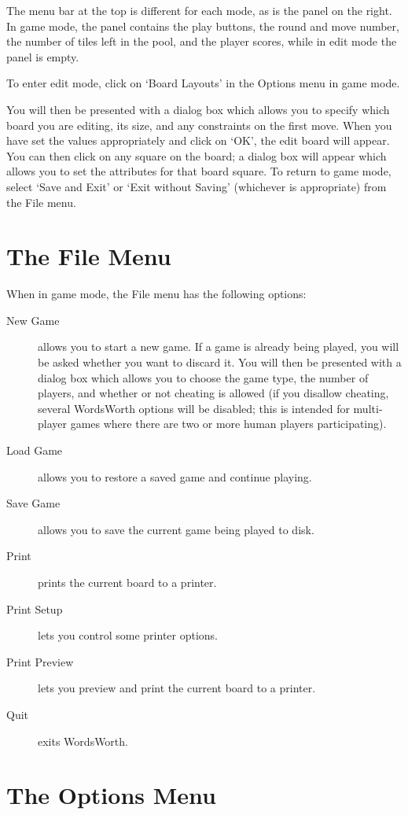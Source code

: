 The menu bar at the top is different for each mode, as is the panel
on the right. In game mode, the panel contains the play buttons,
the round and move number, the number of tiles left in the pool, and
the player scores, while in edit mode the panel is empty.

To enter edit mode, click on `Board Layouts' in the Options menu 
in game mode.

You will then be presented with a dialog box which allows you to 
specify which board you are editing, its size, and any constraints
on the first move. When you have set the values appropriately and
click on `OK', the edit board will appear. You can then click on 
any square on the board; a dialog box will appear which allows you to
set the attributes for that board square.
To return to game mode, select `Save and Exit' or `Exit without
Saving' (whichever is appropriate) from the File menu.

\section{The File Menu}

When in game mode, the File menu has the following options:

\begin{description}
\item [New Game] allows you to start a new game. If a game is
already being played, you will be asked whether you want to discard
it. You will then be presented with a dialog box which allows you to
choose the game type, the number of players, and whether or not
cheating is allowed (if you disallow cheating, several WordsWorth
options will be disabled; this is intended for multi-player games
where there are two or more human players participating).
\item [Load Game] allows you to restore a saved game and
continue playing.
\item [Save Game] allows you to save the current game being
played to disk.
\item [Print] prints the current board to a printer.
\item [Print Setup] lets you control some printer options.
\item [Print Preview] lets you preview and print the current board 
to a printer.
\item [Quit] exits WordsWorth.
\end{description}

\section{The Options Menu}

